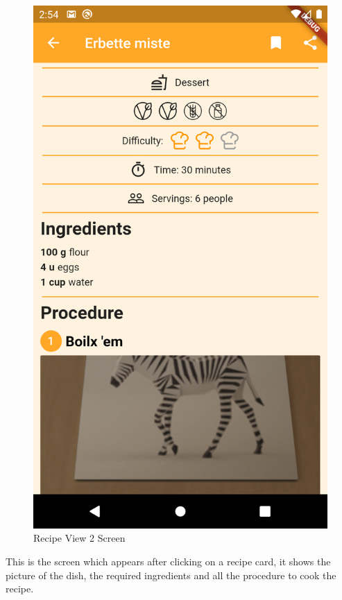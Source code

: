 \begin{figure}
\begin{minipage}{0.48\textwidth}
		\includegraphics[width = .7\linewidth]{img/RecipeView_2.png}
		\caption{Recipe View 2 Screen}
	\end{minipage}
\end{figure}
This is the screen which appears after clicking on a recipe card, it shows the picture of the dish, the required ingredients and all the procedure to cook the recipe.
